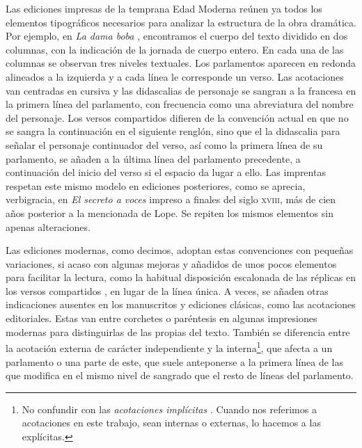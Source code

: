 Las ediciones impresas de la temprana Edad Moderna reúnen ya todos los elementos tipográficos necesarios para analizar la estructura de la obra dramática. Por ejemplo, en \textit{La dama boba} \parencite{vega1617}, encontramos el cuerpo del texto dividido en dos columnas, con la indicación de la jornada de cuerpo entero. En cada una de las columnas se observan tres niveles textuales. Los parlamentos aparecen en redonda alineados a la izquierda y a cada línea le corresponde un verso. Las acotaciones van centradas en cursiva y las didascalias de personaje se sangran a la francesa en la primera línea del parlamento, con frecuencia como una abreviatura del nombre del personaje. Los versos compartidos difieren de la convención actual en que no se sangra la continuación en el siguiente renglón, sino que el la didascalia para señalar el personaje continuador del verso, así como la primera línea de su parlamento, se añaden a la última línea del parlamento precedente, a continuación del inicio del verso si el espacio da lugar a ello. Las imprentas respetan este mismo modelo en ediciones posteriores, como se aprecia, verbigracia, en \textit{El secreto a voces} \parencite{calderon1795} impreso a finales del siglo \textsc{xviii}, más de cien años posterior a la mencionada de Lope. Se repiten los mismos elementos sin apenas alteraciones.

Las ediciones modernas, como decimos, adoptan estas convenciones con pequeñas variaciones, si acaso con algunas mejoras y añadidos de unos pocos elementos para facilitar la lectura, como la habitual disposición escalonada de las réplicas en los versos compartidos \parencite[67]{arellano2007}, en lugar de la línea única. A veces, se añaden otras indicaciones ausentes en los manuscritos y ediciones clásicas, como las acotaciones editoriales. Estas van entre corchetes o paréntesis en algunas impresiones modernas para distinguirlas de las propias del texto. También se diferencia entre la acotación externa de carácter independiente y la interna\footnote{No confundir con las \textit{acotaciones implícitas} \parencite[38-40]{monzo2019}. Cuando nos referimos a acotaciones en este trabajo, sean internas o externas, lo hacemos a las explícitas.}, que afecta a un parlamento o una parte de este, que suele anteponerse a la primera línea de las que modifica en el mismo nivel de sangrado que el resto de líneas del parlamento.

